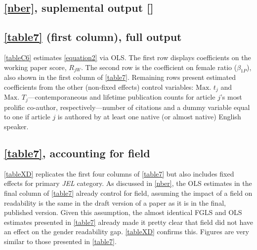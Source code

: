 \begin{appendices}




\clearpage

\section{\autoref{nber}, suplemental output []}
\label{nbersuplementaloutput}

\subsection{\autoref{table7} (first column), full output}
\label{appendixdraftcorr}

\autoref{tableC6} estimates \autoref{equation2} via OLS. The first row displays coefficients on the working paper score, $R_{jW}$. The second row is the coefficient on female ratio ($\beta_{1P}$), also shown in the first column of \autoref{table7}. Remaining rows present estimated coefficients from the other (non-fixed effects) control variables: $\text{Max. }t_j$ and $\text{Max. }T_j$---contemporaneous and lifetime publication counts for article $j$'s most prolific co-author, respectively---number of citations and a dummy variable equal to one if article $j$ is authored by at least one native (or almost native) English speaker.



\clearpage

\subsection{\autoref{table7}, accounting for field}
\label{appendixnberfield}

\autoref{tableXD} replicates the first four columns of \autoref{table7} but also includes fixed effects for primary \emph{JEL} category. As discussed in \autoref{nber}, the OLS estimates in the final column of \autoref{table7} already control for field, assuming the impact of a field on readability is the same in the draft version of a paper as it is in the final, published version. Given this assumption, the almost identical FGLS and OLS estimates presented in \autoref{table7} already made it pretty clear that field did not have an effect on the gender readability gap. \autoref{tableXD} confirms this. Figures are very similar to those presented in \autoref{table7}.


\end{appendices}
